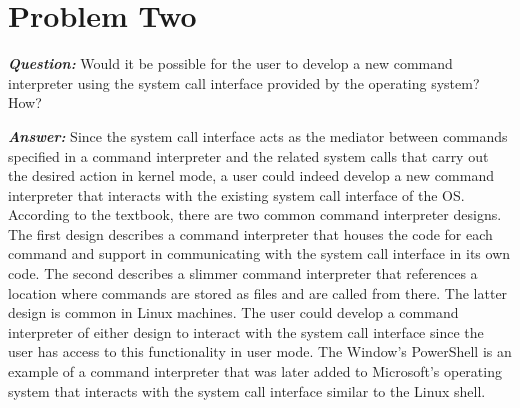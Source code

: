 \documentclass[letterpaper, 10pt,DIV=13]{scrartcl}
\numberwithin{equation}{section} %
\numberwithin{figure}{section} %
\numberwithin{table}{section} %
\begin{document}
\section{Problem Two}

\textbf{\emph{Question:}}
Would it be possible for the user to develop a new command interpreter using the system call interface provided by the operating system? How?

\textbf{\emph{Answer:}}
Since the system call interface acts as the mediator between commands specified in a command interpreter and the related system calls that carry out the desired action in kernel mode, a user could indeed develop a new command interpreter that interacts with the existing system call interface of the OS. According to the textbook, there are two common command interpreter designs. The first design describes a command interpreter that houses the code for each command and support in communicating with the system call interface in its own code. The second describes a slimmer command interpreter that references a location where commands are stored as files and are called from there\cite{concepts}. The latter design is common in Linux machines. The user could develop a command interpreter of either design to interact with the system call interface since the user has access to this functionality in user mode. The Window's PowerShell is an example of a command interpreter that was later added to Microsoft's operating system that interacts with the system call interface similar to the Linux shell. 




 
\end{document}
